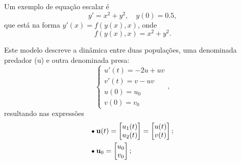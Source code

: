 \documentclass[../differential_methods.tex]{subfiles}
\begin{document}
\begin{example}
	Um exemplo de equação escalar é
	\[
		y'=x^{2}+y^{2},\quad y(0)=0.5,
	\]
	que está na forma \(y'(x)=f(y(x), x)\), onde
	\[
		f(y(x), x)=x^{2}+y^{2}.
	\]
\end{example}
\begin{example}
	Este modelo descreve a dinâmica entre duas populações, uma denominada predador (u) e outra denominada presa:
	\[
		\left\{\begin{array}{ll}
			u'(t)=-2u + uv \\
			v'(t)=v-uv     \\
			u(0)=u_{0}     \\
			v(0)=v_{0}
		\end{array}\right.,
	\]
	resultando nas expressões
	\begin{align*}
		 & \tikz[baseline=-0.5ex]\draw[black, fill=black, radius=1.5pt](0, 0)circle;\; \mathbf{u}(t)=\begin{bmatrix}
			                                                                                             u_1(t) \\
			                                                                                             u_2(t)
		                                                                                             \end{bmatrix} = \begin{bmatrix}
			                                                                                                             u(t) \\
			                                                                                                             v(t)
		                                                                                                             \end{bmatrix};         \\
		 & \tikz[baseline=-0.5ex]\draw[black, fill=black, radius=1.5pt](0, 0)circle;\; \mathbf{u}_{0}= \begin{bmatrix}
			                                                                                               u_{0} \\
			                                                                                               v_{0}
		                                                                                               \end{bmatrix};                       \\

\end{align*}
\end{example}
\end{document}
